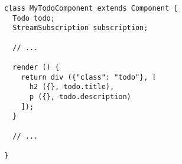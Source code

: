       \begin{verbatim}
class MyTodoComponent extends Component {
  Todo todo;
  StreamSubscription subscription;

  // ...

  render () {
    return div ({"class": "todo"}, [
      h2 ({}, todo.title),
      p ({}, todo.description)
    ]);
  }

  // ...

}
      \end{verbatim}

